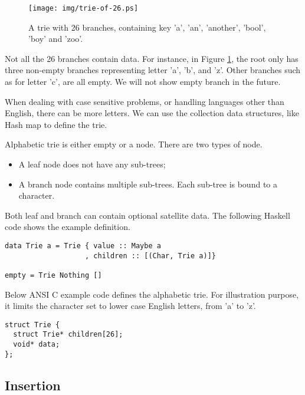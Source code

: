 \documentclass{article}
\begin{document}
\begin{figure}[htbp]
  \centering
  \texttt{[image: img/trie-of-26.ps]}
  \caption{A trie with 26 branches, containing key 'a', 'an', 'another', 'bool',
    'boy' and 'zoo'.}
  \label{fig:trie-of-26}
\end{figure}

Not all the 26 branches contain data. For instance, in Figure \ref{fig:trie-of-26},
the root only has three non-empty branches representing letter 'a',
'b', and 'z'. Other branches such as for letter 'c', are all
empty. We will not show empty branch in the future.

When dealing with case sensitive problems, or handling languages other than English,
there can be more letters. We can use the collection data structures, like Hash map
to define the trie.

Alphabetic trie is either empty or a node. There are two types of node.

\begin{itemize}
\item A leaf node does not have any sub-trees;
\item A branch node contains multiple sub-trees. Each sub-tree is bound to a character.
\end{itemize}

Both leaf and branch can contain optional satellite data. The following Haskell
code shows the example definition.

\lstset{language=Haskell}
\begin{lstlisting}
data Trie a = Trie { value :: Maybe a
                   , children :: [(Char, Trie a)]}

empty = Trie Nothing []
\end{lstlisting}

Below ANSI C example code defines the alphabetic trie. For illustration purpose,
it limits the character set to lower case English letters, from 'a' to 'z'.

\lstset{language=C}
\begin{lstlisting}
struct Trie {
  struct Trie* children[26];
  void* data;
};
\end{lstlisting}


\subsection{Insertion}
\end{document}
